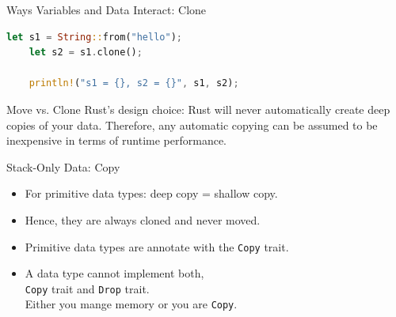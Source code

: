 \begin{Frame}[fragile,t]{Ways Variables and Data Interact: Clone}
  \begin{lstlisting}[language=Rust,gobble=4]
    let s1 = String::from("hello");
    let s2 = s1.clone();

    println!("s1 = {}, s2 = {}", s1, s2);
  \end{lstlisting}

  \hskip3cm
\end{Frame}

\begin{Frame}{Move vs. Clone}
  \Large\centering
  \alert{Rust's design choice}: Rust will \alert{never automatically} create \alert{deep
    copies} of your data. Therefore, any \alert{automatic copying} can be
  assumed to be \alert{inexpensive} in terms of runtime performance.
\end{Frame}

\begin{Frame}{Stack-Only Data: Copy}
  \begin{itemize}
    \item For primitive data types: deep copy = shallow copy.
    \item Hence, they are always cloned and never moved.
    \item Primitive data types are annotate with the \texttt{Copy} trait.
    \item A data type cannot implement both,\\
      \texttt{Copy} trait and \texttt{Drop} trait.\\
      \alert{Either you mange memory or you are \texttt{Copy}.}
  \end{itemize}
\end{Frame}

